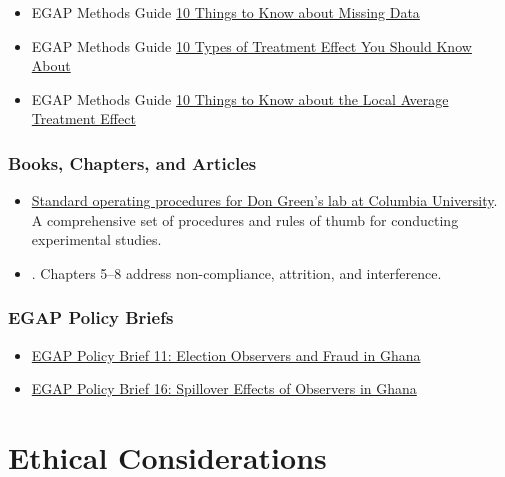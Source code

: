 \documentclass[12pt,]{book}
\providecommand{\tightlist}{%
  \setlength{\itemsep}{0pt}\setlength{\parskip}{0pt}}
\begin{document}
\begin{itemize}
\item
  EGAP Methods Guide \href{https://egap.org/resource/10-things-to-know-about-missing-data/}{10 Things to Know about Missing Data}
\item
  EGAP Methods Guide \href{https://egap.org/resource/10-types-of-treatment-effect-you-should-know-about/}{10 Types of Treatment Effect You Should Know About}
\item
  EGAP Methods Guide \href{https://egap.org/resource/10-things-to-know-about-the-local-average-treatment-effect/}{10 Things to Know about the Local Average Treatment Effect}
\end{itemize}

\hypertarget{books-chapters-and-articles-5}{%
\subsection{Books, Chapters, and Articles}\label{books-chapters-and-articles-5}}

\begin{itemize}
\tightlist
\item
  \href{https://github.com/acoppock/Green-Lab-SOP}{Standard operating procedures for Don Green's lab at Columbia University}. A comprehensive set of procedures and rules of thumb for conducting experimental studies.
\item
  \autocite{gerber_field_2012}. Chapters 5--8 address non-compliance, attrition, and interference.
\end{itemize}

\hypertarget{egap-policy-briefs-3}{%
\subsection{EGAP Policy Briefs}\label{egap-policy-briefs-3}}

\begin{itemize}
\item
  \href{https://egap.org/resource/brief-11-election-observers-and-fraud-in-ghana/}{EGAP Policy Brief 11: Election Observers and Fraud in Ghana}
\item
  \href{https://egap.org/resource/brief-16-spillover-effects-of-observers-in-ghana/}{EGAP Policy Brief 16: Spillover Effects of Observers in Ghana}
\end{itemize}

\hypertarget{ethical-considerations}{%
\chapter{Ethical Considerations}\label{ethical-considerations}}
\end{document}

